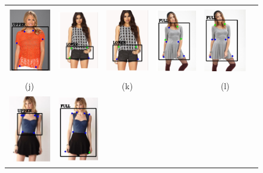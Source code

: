 \documentclass[conference]{IEEEtran}
\begin{document}
\begin{figure}
\begin{tabular} {cccccc}
{\includegraphics[align=c, width = 0.8in, height= 3cm]{images/p_10.PNG}} &
{\includegraphics[align=c, width = 0.8in, height= 3cm]{images/gt_11.PNG}} &
{\includegraphics[align=c, width = 0.8in, height= 3cm]{images/p_11.PNG}} &
{\includegraphics[align=c, width = 0.8in, height= 3cm]{images/gt_12.PNG}} &
{\includegraphics[align=c,  width = 0.8in, height= 3cm]{images/p_12.PNG}} \\
(j) &  & (k) & & (l) &\\
{\includegraphics[align=c,  width = 0.75in, height= 3cm]{images/gt_13.PNG}} &
{\includegraphics[align=c,  width = 0.8in, height= 3cm]{images/p_13.PNG}} &

\end{tabular}
\end{figure}
\end{document}
